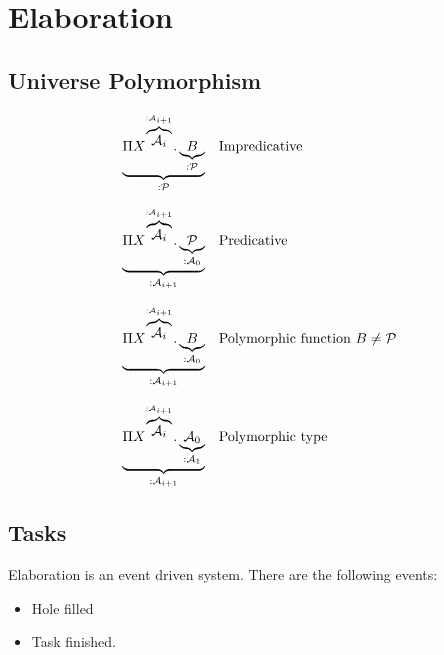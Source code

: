 \section{Elaboration}





\subsection{Universe Polymorphism}

$$
\begin{array}{ll}
    \underbrace{
        \Pi
        X^{\overbrace{\Any_i}^{: \Any_{i+1}}}
        .
        \underbrace{B}_{: \Prop}
    }_{: \Prop}
    &\text{Impredicative}
    \\
    \\
    \underbrace{
        \Pi
        X^{\overbrace{\Any_i}^{: \Any_{i+1}}}
        .
        \underbrace{\Prop}_{: \Any_0}
    }_{: \Any_{i+1}}
    &\text{Predicative}
    \\
    \\
    \underbrace{
        \Pi
        X^{\overbrace{\Any_i}^{: \Any_{i+1}}}
        .
        \underbrace{B}_{: \Any_0}
    }_{: \Any_{i+1}}
    &\text{Polymorphic function } B \ne \Prop
    \\
    \\
    \underbrace{
        \Pi
        X^{\overbrace{\Any_i}^{: \Any_{i+1}}}
        .
        \underbrace{\Any_0}_{: \Any_1}
    }_{: \Any_{i+1}}
    &\text{Polymorphic type}

\end{array}
$$




\subsection{Tasks}

Elaboration is an event driven system. There are the following events:

\begin{itemize}
    \item Hole filled
    \item Task finished.
\end{itemize}


